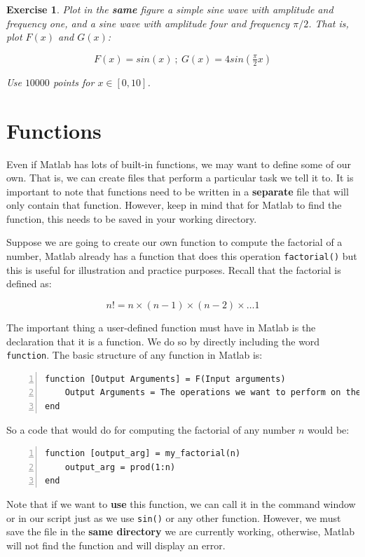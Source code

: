 \documentclass[a4paper,11pt]{article}
\newtheorem{exercise}{Exercise}
\begin{document}
\begin{exercise}
Plot in the \textbf{same} figure a simple sine wave with amplitude and frequency one, and a sine wave with amplitude four and frequency $\pi/2$. That is, plot $F(x)$ and $G(x)$:

\[
F(x) = sin(x) \ ; \ G(x) = 4sin(\tfrac{\pi}{2}x)
\]

Use $10000$ points for $x\in[0,10]$.
\end{exercise}

\section{Functions}

Even if Matlab has lots of built-in functions, we may want to define some of our own. That is, we can create files that perform a particular task we tell it to. It is important to note that functions need to be written in a \textbf{separate} file that will only contain that function. However, keep in mind that for Matlab to find the function, this needs to be saved in your working directory.

Suppose we are going to create our own function to compute the factorial of a number, Matlab already has a function that does this operation \texttt{factorial()} but this is useful for illustration and practice purposes. Recall that the factorial is defined as:

\[
n! = n\times(n-1)\times(n-2)\times \ldots 1 
\]

The important thing a user-defined function must have in Matlab is the declaration that it is a function. We do so by directly including the word \texttt{function}. The basic structure of any function in Matlab is:

\begin{Verbatim}[numbers=left, fontsize = \small]
function [Output Arguments] = F(Input arguments)
	Output Arguments = The operations we want to perform on the Input Arguments
end
\end{Verbatim}

So a code that would do for computing the factorial of any number $n$ would be:

\begin{Verbatim}[numbers=left, fontsize = \small]
function [output_arg] = my_factorial(n) 
	output_arg = prod(1:n)
end
\end{Verbatim}

Note that if we want to \textbf{use} this function, we can call it in the command window or in our script just as we use \verb;sin(); or any other function. However, we must save the file in the \textbf{same directory} we are currently working, otherwise, Matlab will not find the function and will display an error.
\end{document}
